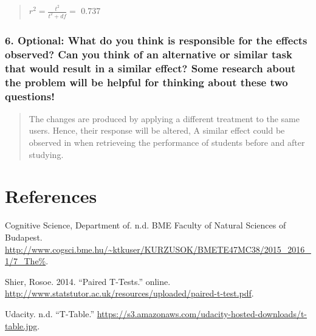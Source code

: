 \documentclass[]{article}
\begin{document}
\begin{quote}
\(r^2= \frac{t^2}{t^2+df}=\) 0.737
\end{quote}

\subsubsection{6. Optional: What do you think is responsible for the
effects observed? Can you think of an alternative or similar task that
would result in a similar effect? Some research about the problem will
be helpful for thinking about these two
questions!}\label{optional-what-do-you-think-is-responsible-for-the-effects-observed-can-you-think-of-an-alternative-or-similar-task-that-would-result-in-a-similar-effect-some-research-about-the-problem-will-be-helpful-for-thinking-about-these-two-questions}

\begin{quote}
The changes are produced by applying a different treatment to the same
users. Hence, their response will be altered, A similar effect could be
observed in when retrieveing the performance of students before and
after studying.
\end{quote}

\section*{References}\label{references}

\hypertarget{refs}{}
\hypertarget{ref-slides_t_test}{}
Cognitive Science, Department of. n.d. BME Faculty of Natural Sciences
of Budapest.
\url{http://www.cogsci.bme.hu/~ktkuser/KURZUSOK/BMETE47MC38/2015_2016_1/7_The\%}.

\hypertarget{ref-stanford_t_test}{}
Shier, Rosoe. 2014. ``Paired T-Tests.'' online.
\url{http://www.statstutor.ac.uk/resources/uploaded/paired-t-test.pdf}.

\hypertarget{ref-t-table}{}
Udacity. n.d. ``T-Table.''
\url{https://s3.amazonaws.com/udacity-hosted-downloads/t-table.jpg}.
\end{document}
